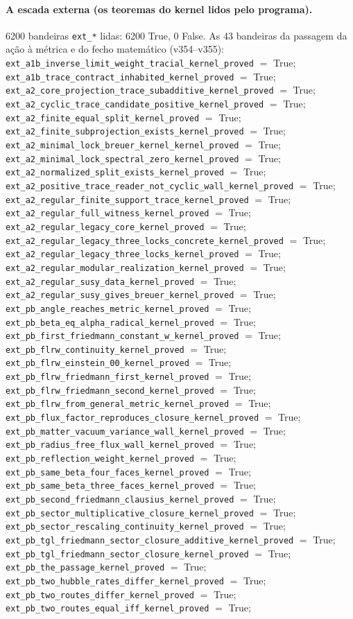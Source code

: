 \documentclass[11pt]{article}
\theoremstyle{definition}\newtheorem{deriv}{Derivação}
\begin{document}
\paragraph*{A escada externa (os teoremas do kernel lidos pelo programa).} 6200 bandeiras \texttt{ext\_*} lidas: 6200 True, 0 False. As 43 bandeiras da passagem da ação à métrica e do fecho matemático (v354--v355): \texttt{ext\_a1b\_inverse\_limit\_weight\_tracial\_kernel\_proved} $=$ True; \texttt{ext\_a1b\_trace\_contract\_inhabited\_kernel\_proved} $=$ True; \texttt{ext\_a2\_core\_projection\_trace\_subadditive\_kernel\_proved} $=$ True; \texttt{ext\_a2\_cyclic\_trace\_candidate\_positive\_kernel\_proved} $=$ True; \texttt{ext\_a2\_finite\_equal\_split\_kernel\_proved} $=$ True; \texttt{ext\_a2\_finite\_subprojection\_exists\_kernel\_proved} $=$ True; \texttt{ext\_a2\_minimal\_lock\_breuer\_kernel\_kernel\_proved} $=$ True; \texttt{ext\_a2\_minimal\_lock\_spectral\_zero\_kernel\_proved} $=$ True; \texttt{ext\_a2\_normalized\_split\_exists\_kernel\_proved} $=$ True; \texttt{ext\_a2\_positive\_trace\_reader\_not\_cyclic\_wall\_kernel\_proved} $=$ True; \texttt{ext\_a2\_regular\_finite\_support\_trace\_kernel\_proved} $=$ True; \texttt{ext\_a2\_regular\_full\_witness\_kernel\_proved} $=$ True; \texttt{ext\_a2\_regular\_legacy\_core\_kernel\_proved} $=$ True; \texttt{ext\_a2\_regular\_legacy\_three\_locks\_concrete\_kernel\_proved} $=$ True; \texttt{ext\_a2\_regular\_legacy\_three\_locks\_kernel\_proved} $=$ True; \texttt{ext\_a2\_regular\_modular\_realization\_kernel\_proved} $=$ True; \texttt{ext\_a2\_regular\_susy\_data\_kernel\_proved} $=$ True; \texttt{ext\_a2\_regular\_susy\_gives\_breuer\_kernel\_proved} $=$ True; \texttt{ext\_pb\_angle\_reaches\_metric\_kernel\_proved} $=$ True; \texttt{ext\_pb\_beta\_eq\_alpha\_radical\_kernel\_proved} $=$ True; \texttt{ext\_pb\_first\_friedmann\_constant\_w\_kernel\_proved} $=$ True; \texttt{ext\_pb\_flrw\_continuity\_kernel\_proved} $=$ True; \texttt{ext\_pb\_flrw\_einstein\_00\_kernel\_proved} $=$ True; \texttt{ext\_pb\_flrw\_friedmann\_first\_kernel\_proved} $=$ True; \texttt{ext\_pb\_flrw\_friedmann\_second\_kernel\_proved} $=$ True; \texttt{ext\_pb\_flrw\_from\_general\_metric\_kernel\_proved} $=$ True; \texttt{ext\_pb\_flux\_factor\_reproduces\_closure\_kernel\_proved} $=$ True; \texttt{ext\_pb\_matter\_vacuum\_variance\_wall\_kernel\_proved} $=$ True; \texttt{ext\_pb\_radius\_free\_flux\_wall\_kernel\_proved} $=$ True; \texttt{ext\_pb\_reflection\_weight\_kernel\_proved} $=$ True; \texttt{ext\_pb\_same\_beta\_four\_faces\_kernel\_proved} $=$ True; \texttt{ext\_pb\_same\_beta\_three\_faces\_kernel\_proved} $=$ True; \texttt{ext\_pb\_second\_friedmann\_clausius\_kernel\_proved} $=$ True; \texttt{ext\_pb\_sector\_multiplicative\_closure\_kernel\_proved} $=$ True; \texttt{ext\_pb\_sector\_rescaling\_continuity\_kernel\_proved} $=$ True; \texttt{ext\_pb\_tgl\_friedmann\_sector\_closure\_additive\_kernel\_proved} $=$ True; \texttt{ext\_pb\_tgl\_friedmann\_sector\_closure\_kernel\_proved} $=$ True; \texttt{ext\_pb\_the\_passage\_kernel\_proved} $=$ True; \texttt{ext\_pb\_two\_hubble\_rates\_differ\_kernel\_proved} $=$ True; \texttt{ext\_pb\_two\_routes\_differ\_kernel\_proved} $=$ True; \texttt{ext\_pb\_two\_routes\_equal\_iff\_kernel\_proved} $=$ True; 
\end{document}
